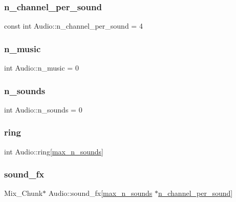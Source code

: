 \mbox{\label{namespace_audio_aec2041a2957ceb8f8646d1e56a504898}} 
\subsubsection{\texorpdfstring{n\+\_\+channel\+\_\+per\+\_\+sound}{n\_channel\_per\_sound}}
{\footnotesize\ttfamily const int Audio\+::n\+\_\+channel\+\_\+per\+\_\+sound = 4}

\mbox{\label{namespace_audio_aeeef9c9e2deb568319c142902194ea74}} 
\subsubsection{\texorpdfstring{n\+\_\+music}{n\_music}}
{\footnotesize\ttfamily int Audio\+::n\+\_\+music = 0}

\mbox{\label{namespace_audio_a72f0021eb0e6702063affe3dd2dd0d7d}} 
\subsubsection{\texorpdfstring{n\+\_\+sounds}{n\_sounds}}
{\footnotesize\ttfamily int Audio\+::n\+\_\+sounds = 0}

\mbox{\label{namespace_audio_a71cdec3ecb580136aec8edc6a9024c66}} 
\subsubsection{\texorpdfstring{ring}{ring}}
{\footnotesize\ttfamily int Audio\+::ring\mbox{[}\mbox{\hyperlink{namespace_audio_a0f535450e240117fb4fcaa86c1cc99c7}{max\+\_\+n\+\_\+sounds}}\mbox{]}}

\mbox{\label{namespace_audio_ae3973e12013a4dc43241f0200d559890}} 
\subsubsection{\texorpdfstring{sound\+\_\+fx}{sound\_fx}}
{\footnotesize\ttfamily Mix\+\_\+\+Chunk$\ast$ Audio\+::sound\+\_\+fx\mbox{[}\mbox{\hyperlink{namespace_audio_a0f535450e240117fb4fcaa86c1cc99c7}{max\+\_\+n\+\_\+sounds}} $\ast$\mbox{\hyperlink{namespace_audio_aec2041a2957ceb8f8646d1e56a504898}{n\+\_\+channel\+\_\+per\+\_\+sound}}\mbox{]}}

